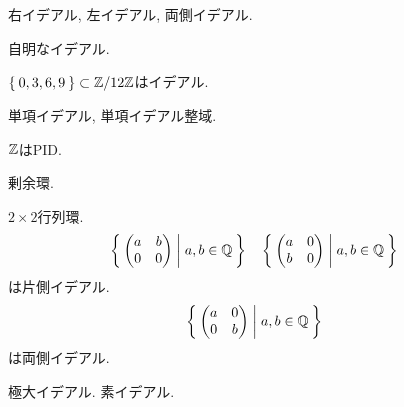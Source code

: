   \section{}
  \begin{definition}
    右イデアル, 左イデアル, 両側イデアル.
  \end{definition}
  \begin{example}
    自明なイデアル.
  \end{example}
  \begin{example}
    $\Set{0,3,6,9}\subset\mathbb{Z}/12\mathbb{Z}$はイデアル.
  \end{example}
  \begin{definition}
    単項イデアル, 単項イデアル整域.
  \end{definition}
  \begin{example}
    $\mathbb{Z}$はPID.
  \end{example}
  \begin{definition}
    剰余環.
  \end{definition}
  \begin{example}
    $2\times 2$行列環.
    \begin{align*}
      &\Set{\begin{pmatrix}a&b\\0&0\end{pmatrix}|a,b\in \mathbb{Q}}
      &&\Set{\begin{pmatrix}a&0\\b&0\end{pmatrix}|a,b\in \mathbb{Q}}
    \end{align*}
    は片側イデアル.
    \begin{align*}
      &\Set{\begin{pmatrix}a&0\\0&b\end{pmatrix}|a,b\in \mathbb{Q}}
    \end{align*}
    は両側イデアル.
  \end{example}
  \begin{definition}
    極大イデアル. 素イデアル.
  \end{definition}

